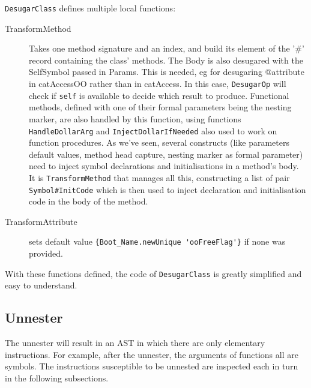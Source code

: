 \documentclass[a4paper]{memoir}
\begin{document}
\lstinline!DesugarClass! defines multiple local functions:
\begin{description}
  \item[TransformMethod] Takes one method signature and an index, and build its
    element of the '\#' record containing the class' methods. The Body is also desugared with the SelfSymbol passed in Params.
    This is needed, eg for desugaring @attribute in catAccessOO rather than in
    catAccess. In this case, \lstinline!DesugarOp! will check if
    \lstinline!self! is available to decide which result to produce.
    Functional methods, defined with one of their formal parameters being the
    nesting marker, are also handled by this function, using functions
    \lstinline!HandleDollarArg! and \lstinline!InjectDollarIfNeeded! also used
    to work on function procedures.
    As we've seen, several constructs (like parameters default values, method head capture, nesting marker
    as formal parameter) need to inject symbol declarations and initialisations
    in a method's body. It is \lstinline!TransformMethod! that manages all this,
    constructing a list of pair \lstinline!Symbol#InitCode! which is then used
    to inject declaration and initialisation code in the body of the method.
  \item[TransformAttribute] sets default value  
    \lstinline!{Boot_Name.newUnique 'ooFreeFlag'}! if none was provided.
\end{description}
With these functions defined, the code of \lstinline!DesugarClass! is greatly
simplified and easy to understand.

\subsection{Unnester}\label{sec:arch:unnester}
The unnester will result in an AST in which there are only elementary
instructions. For example, after the unnester, the arguments of functions all
are symbols. The instructions susceptible to be unnested are inspected each in turn in the following subsections.
\end{document}

